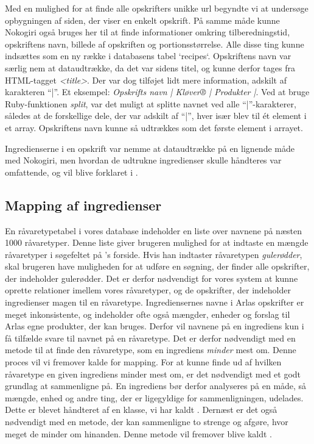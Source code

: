 Med en mulighed for at finde alle opskrifters unikke url begyndte vi at undersøge opbygningen af siden, der viser en enkelt opskrift.
På samme måde kunne Nokogiri også bruges her til at finde informationer omkring tilberedningstid, opskriftens navn, billede af opskriften og portionsstørrelse. Alle disse ting kunne indsættes som en ny række i databasens tabel `recipes`. Opskriftens navn var særlig nem at dataudtrække, da det var sidens titel, og kunne derfor tages fra HTML-tagget \textit{<title>}. Der var dog tilføjet lidt mere information, adskilt af karakteren ``|''. Et eksempel: \textit{Opskrifts navn | Kløver® | Produkter |}. Ved at bruge Ruby-funktionen \textit{split}\cite{rubydoc}, var det muligt at splitte navnet ved alle ``|''-karakterer, således at de forskellige dele, der var adskilt af ``|'', hver især blev til ét element i et array. Opskriftens navn kunne så udtrækkes som det første element i arrayet.

Ingredienserne i en opskrift var nemme at dataudtrække på en lignende måde med Nokogiri, men hvordan de udtrukne ingredienser skulle håndteres var omfattende, og vil blive forklaret i .

\subsection{Mapping af ingredienser}
\label{sec:mapping}
En råvaretypetabel i vores database indeholder en liste over navnene på næsten 1000 råvaretyper. Denne liste giver brugeren mulighed for at indtaste en mængde råvaretyper i søgefeltet på \Foodl{}'s forside. Hvis han indtaster råvaretypen \textit{gulerødder}, skal brugeren have muligheden for at udføre en søgning, der finder alle opskrifter, der indeholder gulerødder. Det er derfor nødvendigt for vores system at kunne oprette relationer imellem vores råvaretyper, og de opskrifter, der indeholder ingredienser magen til en råvaretype. Ingrediensernes navne i Arlas opskrifter er meget inkonsistente, og indeholder ofte også mængder, enheder og forslag til Arlas egne produkter, der kan bruges. Derfor vil navnene på en ingrediens kun i få tilfælde svare til navnet på en råvaretype. Det er derfor nødvendigt med en metode til at finde den råvaretype, som en ingrediens \textit{minder} mest om. Denne proces vil vi fremover kalde for mapping. For at kunne finde ud af hvilken råvaretype en given ingrediens minder mest om, er det nødvendigt med et godt grundlag at sammenligne på. En ingrediens bør derfor analyseres på en måde, så mængde, enhed og andre ting, der er ligegyldige for sammenligningen, udelades. Dette er blevet håndteret af en klasse, vi har kaldt . Dernæst er det også nødvendigt med en metode, der kan sammenligne to strenge og afgøre, hvor meget de minder om hinanden. Denne metode vil fremover blive kaldt .

